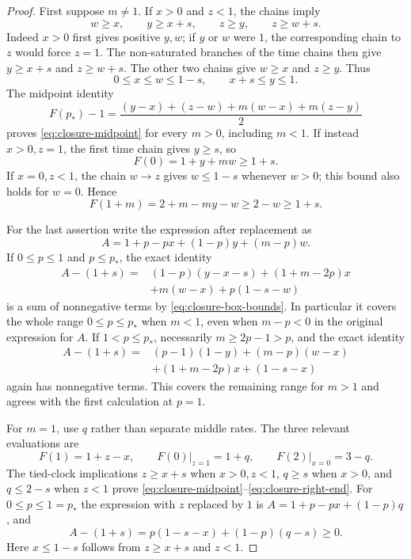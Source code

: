 \begin{proof}
First suppose $m\ne1$.  If $x>0$ and $z<1$, the chains imply
\begin{equation}
 w\ge x,\qquad y\ge x+s,\qquad z\ge y,\qquad z\ge w+s.
 \label{eq:closure-chain-box}
\end{equation}
Indeed $x>0$ first gives positive $y,w$; if $y$ or $w$ were $1$,
the corresponding chain to $z$ would force $z=1$.  The non-saturated
branches of the time chains then give $y\ge x+s$ and $z\ge w+s$.
The other two chains give $w\ge x$ and $z\ge y$.  Thus
\begin{equation}
 0\le x\le w\le1-s,\qquad x+s\le y\le1.
 \label{eq:closure-box-bounds}
\end{equation}
The midpoint identity
\[
 F(p_*)-1
 =\frac{(y-x)+(z-w)+m(w-x)+m(z-y)}2
\]
proves \eqref{eq:closure-midpoint} for every $m>0$, including
$m<1$.  If instead $x>0,z=1$, the first time chain gives $y\ge s$,
so
\[
 F(0)=1+y+mw\ge1+s.
\]
If $x=0,z<1$, the chain $w\to z$ gives $w\le1-s$ whenever $w>0$;
this bound also holds for $w=0$.  Hence
\[
 F(1+m)=2+m-my-w\ge2-w\ge1+s.
\]

For the last assertion write the expression after replacement as
\[
 A=1+p-px+(1-p)y+(m-p)w.
\]
If $0\le p\le1$ and $p\le p_*$, the exact identity
\begin{align*}
 A-(1+s)
  ={}&(1-p)(y-x-s)+(1+m-2p)x\\
     &+m(w-x)+p(1-s-w)
\end{align*}
is a sum of nonnegative terms by \eqref{eq:closure-box-bounds}.
In particular it covers the whole range $0\le p\le p_*$ when
$m<1$, even when $m-p<0$ in the original expression for $A$.
If $1<p\le p_*$, necessarily $m\ge2p-1>p$, and the exact identity
\begin{align*}
 A-(1+s)
  ={}&(p-1)(1-y)+(m-p)(w-x)\\
     &+(1+m-2p)x+(1-s-x)
\end{align*}
again has nonnegative terms.  This covers the remaining range for
$m>1$ and agrees with the first calculation at $p=1$.

For $m=1$, use $q$ rather than separate middle rates.  The three
relevant evaluations are
\[
 F(1)=1+z-x,\qquad
 F(0)\big|_{z=1}=1+q,\qquad
 F(2)\big|_{x=0}=3-q.
\]
The tied-clock implications $z\ge x+s$ when $x>0,z<1$,
$q\ge s$ when $x>0$, and $q\le2-s$ when $z<1$ prove
\eqref{eq:closure-midpoint}--\eqref{eq:closure-right-end}.
For $0\le p\le1=p_*$ the expression with $z$ replaced by $1$ is
$A=1+p-px+(1-p)q$, and
\[
 A-(1+s)=p(1-s-x)+(1-p)(q-s)\ge0.
\]
Here $x\le1-s$ follows from $z\ge x+s$ and $z<1$.
\end{proof}

